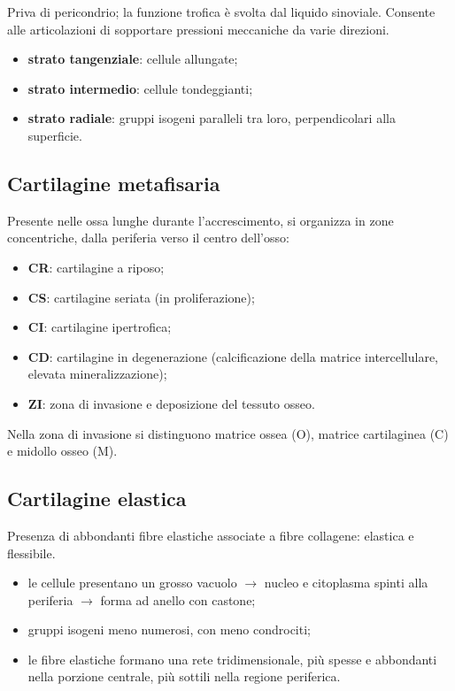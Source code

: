 Priva di pericondrio; la funzione trofica è svolta dal liquido sinoviale. Consente alle articolazioni di sopportare pressioni meccaniche da varie direzioni.
\begin{itemize}
  \item \textbf{strato tangenziale}: cellule allungate;
  \item \textbf{strato intermedio}: cellule tondeggianti;
  \item \textbf{strato radiale}: gruppi isogeni paralleli tra loro, perpendicolari alla superficie.
\end{itemize}

\subsection{Cartilagine metafisaria}

Presente nelle ossa lunghe durante l'accrescimento, si organizza in zone concentriche, dalla periferia verso il centro dell'osso:
\begin{itemize}
  \item \textbf{CR}: cartilagine a riposo;
  \item \textbf{CS}: cartilagine seriata (in proliferazione);
  \item \textbf{CI}: cartilagine ipertrofica;
  \item \textbf{CD}: cartilagine in degenerazione (calcificazione della matrice intercellulare, elevata mineralizzazione);
  \item \textbf{ZI}: zona di invasione e deposizione del tessuto osseo.
\end{itemize}
Nella zona di invasione si distinguono matrice ossea (O), matrice cartilaginea (C) e midollo osseo (M).

\subsection{Cartilagine elastica}

Presenza di abbondanti fibre elastiche associate a fibre collagene: elastica e flessibile.
\begin{itemize}
  \item le cellule presentano un grosso vacuolo $\rightarrow$ nucleo e citoplasma spinti alla periferia $\rightarrow$ forma ad anello con castone;
  \item gruppi isogeni meno numerosi, con meno condrociti;
  \item le fibre elastiche formano una rete tridimensionale, più spesse e abbondanti nella porzione centrale, più sottili nella regione periferica.
\end{itemize}

